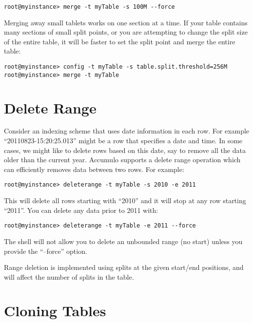 \small
\begin{verbatim}
root@myinstance> merge -t myTable -s 100M --force
\end{verbatim}
\normalsize

Merging away small tablets works on one section at a time.  If your
table contains many sections of small split points, or you are
attempting to change the split size of the entire table, it will be
faster to set the split point and merge the entire table:

\small
\begin{verbatim}
root@myinstance> config -t myTable -s table.split.threshold=256M
root@myinstance> merge -t myTable
\end{verbatim}
\normalsize

\section{Delete Range}

Consider an indexing scheme that uses date information in each row.
For example ``20110823-15:20:25.013'' might be a row that specifies a
date and time.  In some cases, we might like to delete rows based on
this date, say to remove all the data older than the current year.
Accumulo supports a delete range operation which can efficiently
removes data between two rows.  For example:

\small
\begin{verbatim}
root@myinstance> deleterange -t myTable -s 2010 -e 2011
\end{verbatim}
\normalsize

This will delete all rows starting with ``2010'' and it will stop at
any row starting ``2011''.  You can delete any data prior to 2011
with:

\small
\begin{verbatim}
root@myinstance> deleterange -t myTable -e 2011 --force
\end{verbatim}
\normalsize

The shell will not allow you to delete an unbounded range (no start)
unless you provide the ``--force'' option.

Range deletion is implemented using splits at the given start/end
positions, and will affect the number of splits in the table.

\section{Cloning Tables}

